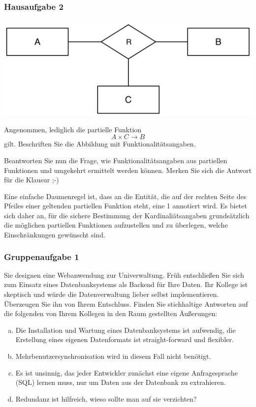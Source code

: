\begin{frame}
	\frametitle{Hausaufgabe 2}
	\vspace{0.5cm}

	\begin{multicols}{2}
		\begin{center}
			\includegraphics[height=.2\paperheight]{./img1.png}
		\end{center}
		Angenommen, lediglich die partielle Funktion
		\[ A \times C \rightarrow B \]
		gilt.
		Beschriften Sie die Abbildung mit Funktionalitätsangaben.

		Beantworten Sie nun die Frage, wie Funktionalitätsangaben aus partiellen
		Funktionen und umgekehrt ermittelt werden können.
		Merken Sie sich die Antwort für die Klausur ;-)

		\pause
		\vfill\columnbreak

		Eine einfache Daumenregel ist, dass an die Entität, die auf der rechten Seite des
		Pfeiles einer geltenden partiellen Funktion steht, eine 1 annotiert wird.
		Es bietet sich daher an, für die sichere Bestimmung der
		Kardinaliätsangaben grundsätzlich die möglichen partiellen Funktionen aufzustellen und
		zu überlegen, welche Einschränkungen gewünscht sind.
	\end{multicols}

\end{frame}

\begin{frame}
	\frametitle{Gruppenaufgabe 1}
	\vspace{0.5cm}

	Sie designen eine Webanwendung zur Univerwaltung.
	Früh entschließen Sie sich zum Einsatz eines Datenbanksystems als
	Backend für Ihre Daten.
	Ihr Kollege ist skeptisch und würde die Datenverwaltung lieber selbst implementieren.
	Überzeugen Sie ihn von Ihrem Entschluss.
	Finden Sie stichhaltige Antworten auf die folgenden von Ihrem Kollegen in den Raum
	gestellten Äußerungen:
	\begin{enumerate}[(a)]
		\item Die Installation und Wartung eines Datenbanksystems ist aufwendig,
		      die Erstellung eines eigenen Datenformats ist straight-forward und flexibler.
		\item Mehrbenutzersynchronisation wird in diesem Fall nicht benötigt.
		\item Es ist unsinnig, das jeder Entwickler zunächst eine eigene Anfragesprache (SQL)
		      lernen muss, nur um Daten aus der Datenbank zu extrahieren.
		\item Redundanz ist hilfreich, wieso sollte man auf sie verzichten?
	\end{enumerate}
\end{frame}

